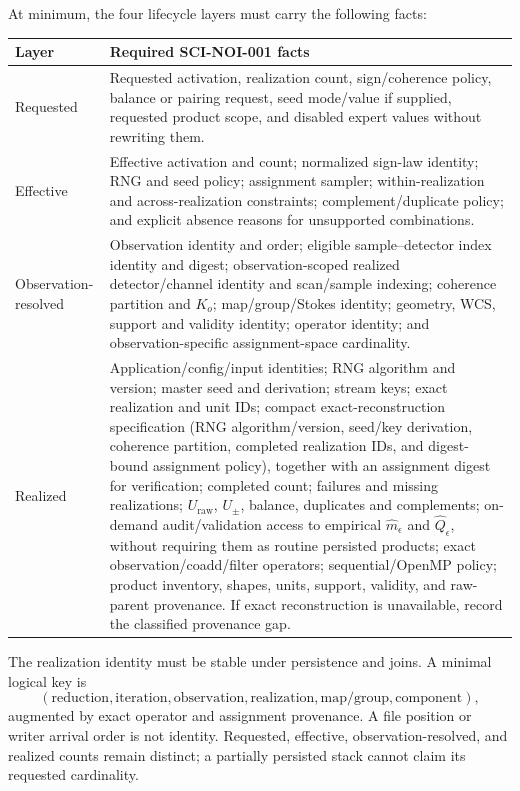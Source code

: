 \documentclass[11pt]{article}
\begin{document}
At minimum, the four lifecycle layers must carry the following facts:
\begin{longtable}{>{\raggedright\arraybackslash}p{}
                  >{\raggedright\arraybackslash}p{}}
\toprule
Layer & Required SCI-NOI-001 facts \\
\midrule
\endhead
Requested & Requested activation, realization count, sign/coherence policy,
balance or pairing request, seed mode/value if supplied, requested product
scope, and disabled expert values without rewriting them. \\
Effective & Effective activation and count; normalized sign-law identity;
RNG and seed policy; assignment sampler; within-realization and
across-realization constraints; complement/duplicate policy; and explicit
absence reasons for unsupported combinations. \\
Observation-resolved & Observation identity and order; eligible
sample--detector index identity and digest; observation-scoped realized
detector/channel identity and scan/sample indexing;
coherence partition and $K_o$; map/group/Stokes identity; geometry, WCS,
support and validity identity; operator identity; and observation-specific
assignment-space cardinality. \\
Realized & Application/config/input identities; RNG algorithm and version;
master seed and derivation; stream keys; exact realization and unit IDs;
compact exact-reconstruction specification (RNG algorithm/version,
seed/key derivation, coherence partition, completed realization IDs, and
digest-bound assignment policy), together with an assignment digest for
verification; completed count; failures and missing realizations;
$U_{\mathrm{raw}}$, $U_{\pm}$, balance, duplicates and complements; on-demand
audit/validation access to empirical $\widehat m_\epsilon$ and
$\widehat Q_\epsilon$, without requiring them as routine persisted products;
exact observation/coadd/filter operators; sequential/OpenMP policy; product
inventory, shapes, units, support, validity, and raw-parent provenance.  If
exact reconstruction is unavailable, record the classified provenance gap. \\
\bottomrule
\end{longtable}

The realization identity must be stable under persistence and joins.  A
minimal logical key is
\begin{equation}
  (\text{reduction},\text{iteration},\text{observation},
   \text{realization},\text{map/group},\text{component}),
  \label{eq:realization-identity}
\end{equation}
augmented by exact operator and assignment provenance.  A file position or
writer arrival order is not identity.  Requested, effective,
observation-resolved, and realized counts remain distinct; a partially
persisted stack cannot claim its requested cardinality.
\end{document}
